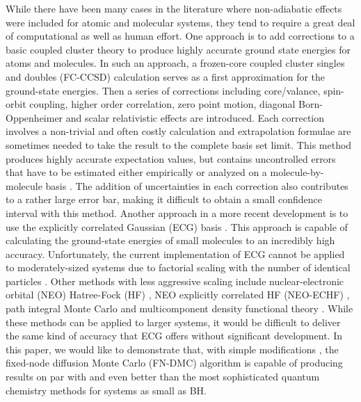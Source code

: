 \documentclass[aps,prl,superscriptaddress,groupedaddress]{revtex4}
\begin{document}
While there have been many cases in the literature where non-adiabatic effects were included for atomic and molecular systems, they tend to require a great deal of computational as well as human effort. One approach is to add corrections to a basic coupled cluster theory to produce highly accurate ground state energies for atoms and molecules\cite{Feller_Corrections}. In such an approach, a frozen-core coupled cluster singles and doubles (FC-CCSD) \cite{Purvis_CCSD} calculation serves as a first approximation for the ground-state energies. Then a series of corrections including core/valance, spin-orbit coupling, higher order correlation, zero point motion, diagonal Born-Oppenheimer and scalar relativistic effects are introduced. Each correction involves a non-trivial and often costly calculation and extrapolation formulae are sometimes needed to take the result to the complete basis set limit. This method produces highly accurate expectation values, but contains uncontrolled errors that have to be estimated either empirically or analyzed on a molecule-by-molecule basis \cite{Feller_Error}. The addition of uncertainties in each correction also contributes to a rather large error bar, making it difficult to obtain a small confidence interval with this method. Another approach in a more recent development is to use the explicitly correlated Gaussian (ECG) basis \cite{Adamowicz_ECG,Mitroy_ECG}. This approach is capable of calculating the ground-state energies of small molecules to an incredibly high accuracy. Unfortunately, the current implementation of ECG cannot be applied to moderately-sized systems due to factorial scaling with the number of identical particles \cite{Bubin_BH_noBO}. Other methods with less aggressive scaling include nuclear-electronic orbital (NEO) Hatree-Fock (HF) \cite{Sharon_NEO}, NEO explicitly correlated HF (NEO-ECHF) \cite{Sharon_NEOX,Sharon_NEOX1,Sharon_NEOX2}, path integral Monte Carlo \cite{Ilkka_Path,Ilkka_Path1,Ilkka_Path2} and multicomponent density functional theory \cite{Sharon_NEO-DFT,Sharon_NEO-DFT1,Sharon_NEO-DFT2,Sharon_NEO-DFT3,Gross_NEO-DFT,Gross_NEO-DFT1}. While these methods can be applied to larger systems, it would be difficult to deliver the same kind of accuracy that ECG offers without significant development. In this paper, we would like to demonstrate that, with simple modifications \cite{Tubman_ECG}, the fixed-node diffusion Monte Carlo (FN-DMC) algorithm is capable of producing results on par with and even better than the most sophisticated quantum chemistry methods for systems as small as BH.
\end{document}
